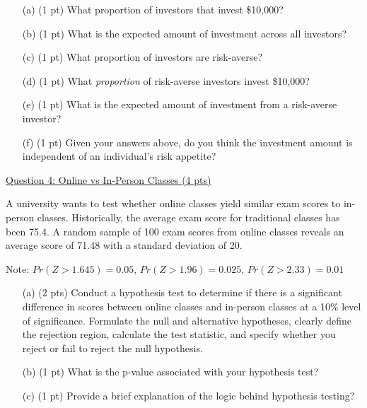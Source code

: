 \documentclass{./../../Latex/tests}
\begin{document}
\begin{enumerate}
\item[(a)] (1 pt) What proportion of investors that invest \$10,000?
\vspace{2cm}

\item[(b)] (1 pt) What is the expected amount of investment across all investors?
\vspace{5.25cm}

\item[(c)] (1 pt) What proportion of investors are risk-averse?
\vspace{1.5cm}

\newpage
\item[(d)] (1 pt) What \textit{proportion} of risk-averse investors invest \$10,000?
\vspace{2.75cm}

\item[(e)] (1 pt) What is the expected amount of investment from a risk-averse investor?
\vspace{8.5cm}

  
\item[(f)] (1 pt) Given your answers above, do you think the investment amount is independent of an individual's risk appetite?

\end{enumerate}

\newpage
\underline{Question 4: Online vs In-Person Classes (4 pts)}

A university wants to test whether online classes yield similar exam scores to in-person classes. Historically, the average exam score for traditional classes has been 75.4. A random sample of 100 exam scores from online classes reveals an average score of 71.48 with a standard deviation of 20.

Note: $Pr(Z>1.645) = 0.05$, $Pr(Z>1.96) = 0.025$, $Pr(Z>2.33) = 0.01$

\begin{enumerate}

\item[(a)] (2 pts) Conduct a hypothesis test to determine if there is a significant difference in scores between online classes and in-person classes at a 10\% level of significance. Formulate the null and alternative hypotheses, clearly define the rejection region, calculate the test statistic, and specify whether you reject or fail to reject the null hypothesis.
\vspace{5.5cm}

\item[(b)] (1 pt) What is the p-value associated with your hypothesis test?
\vspace{4cm}

\item[(c)] (1 pt) Provide a brief explanation of the logic behind hypothesis testing?
\end{enumerate}
\end{document}
